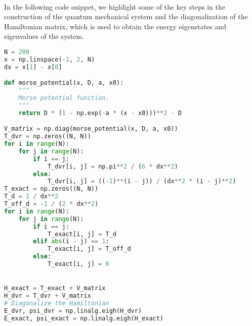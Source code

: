 \documentclass{subfiles}
\begin{document}
\\ 
In the following code snippet, we highlight some of the key steps in the construction of the quantum mechanical system and the diagonalization of the Hamiltonian matrix, which is used to obtain the energy eigenstates and eigenvalues of the system. 
\begin{lstlisting}[language=Python, label=lst:dvr_validation]
N = 200
x = np.linspace(-1, 2, N)
dx = x[1] - x[0]

def morse_potential(x, D, a, x0):
    """
    Morse potential function.
    """
    return D * (1 - np.exp(-a * (x - x0)))**2 - D

V_matrix = np.diag(morse_potential(x, D, a, x0))
T_dvr = np.zeros((N, N))
for i in range(N):
    for j in range(N):
        if i == j:
            T_dvr[i, j] = np.pi**2 / (6 * dx**2)
        else:
            T_dvr[i, j] = ((-1)**(i - j)) / (dx**2 * (i - j)**2)
T_exact = np.zeros((N, N))
T_d = 1 / dx**2 
T_off_d = -1 / (2 * dx**2)
for i in range(N):
    for j in range(N):
        if i == j:
            T_exact[i, j] = T_d
        elif abs(i - j) == 1:
            T_exact[i, j] = T_off_d
        else:
            T_exact[i, j] = 0


H_exact = T_exact + V_matrix
H_dvr = T_dvr + V_matrix
# Diagonalize the Hamiltonian
E_dvr, psi_dvr = np.linalg.eigh(H_dvr)
E_exact, psi_exact = np.linalg.eigh(H_exact)
\end{lstlisting}
\end{document}
